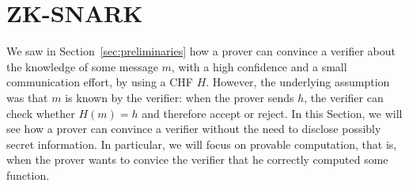 \section{ZK-SNARK}\label{sec:zksnark}
We saw in Section~\ref{sec:preliminaries} how a prover can convince a verifier about the knowledge of
some message \(m\), with a high confidence and a small communication effort, by using a CHF \(H\).
However, the underlying assumption was that \(m\) is known by the verifier: when the prover sends
\(h\), the verifier can check whether \(H(m) = h\) and therefore accept or reject.
In this Section, we will see how a prover can convince a verifier without the need to disclose
possibly secret information.
In particular, we will focus on provable computation, that is, when the prover wants to convice
the verifier that he correctly computed some function.




